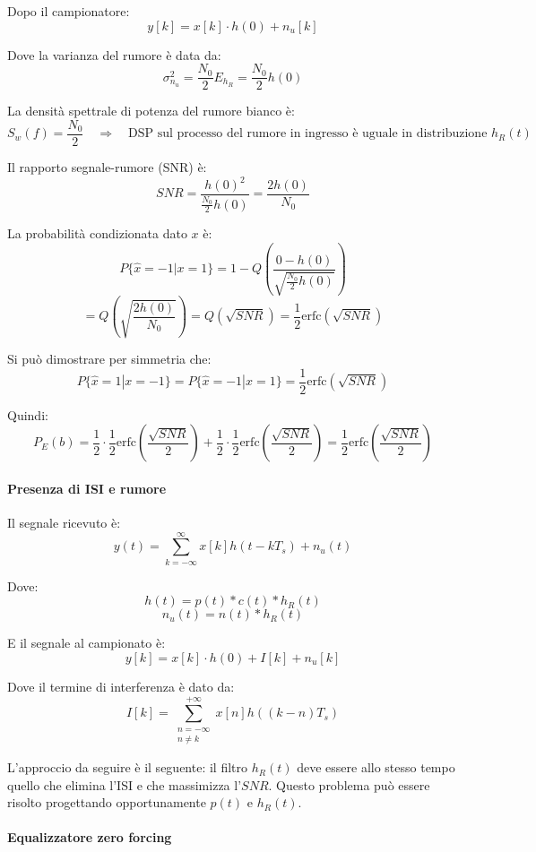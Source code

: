 Dopo il campionatore:
\[
    y[k] = x[k]\cdot h(0) + n_u[k]
\]

Dove la varianza del rumore è data da:
\[
    \sigma_{n_u}^2 = \frac{N_0}{2} E_{h_R} = \frac{N_0}{2} h(0)
\]

La densità spettrale di potenza del rumore bianco è:
\[
    S_w(f) = \frac{N_0}{2} \quad \Rightarrow \quad \text{DSP sul processo del rumore in ingresso è uguale in distribuzione } h_R(t)
\]

Il rapporto segnale-rumore (SNR) è:
\[
    SNR = \frac{h(0)^2}{\frac{N_0}{2} h(0)} = \frac{2 h(0)}{N_0}
\]

La probabilità condizionata dato $x$ è:
\[
    P\{ \hat{x} = -1 | x = 1 \} = 1 - Q\left( \frac{0 - h(0)}{\sqrt{\frac{N_0}{2} h(0)}} \right)
\]
\[
    = Q\left( \sqrt{\frac{2 h(0)}{N_0}} \right) = Q\left( \sqrt{SNR} \right) = \frac{1}{2} \text{erfc}\left( \sqrt{SNR} \right)
\]

Si può dimostrare per simmetria che:
\[
    P\{ \hat{x} = 1 | x = -1 \} = P\{ \hat{x} = -1 | x = 1 \} = \frac{1}{2} \text{erfc}\left( \sqrt{SNR} \right)
\]


Quindi:
\[
    P_E(b) = \frac{1}{2} \cdot \frac{1}{2} \text{erfc}\left( \frac{\sqrt{SNR}}{2} \right) + \frac{1}{2} \cdot \frac{1}{2} \text{erfc}\left( \frac{\sqrt{SNR}}{2} \right) = \frac{1}{2} \text{erfc}\left( \frac{\sqrt{SNR}}{2} \right)
\]

\paragraph{Presenza di ISI e rumore}

Il segnale ricevuto è:
\[
    y(t) = \sum_{k=-\infty}^{\infty} x[k] h(t - kT_s) + n_u(t)
\]

Dove:
\[
    h(t) = p(t) * c(t) * h_R(t)
\]
\[
    n_u(t) = n(t) * h_R(t)
\]

E il segnale al campionato è:
\[
    y[k] = x[k] \cdot h(0) + I[k] + n_u[k]
\]

Dove il termine di interferenza è dato da:
\[
    I[k] = \sum_{\substack{n=-\infty \\ n \neq k}}^{+\infty} x[n] h\left( (k-n)T_s \right)
\]

L'approccio da seguire è il seguente:
il filtro $h_R(t)$ deve essere allo stesso tempo quello che elimina l'ISI e che massimizza l'$SNR$. Questo problema può essere risolto progettando opportunamente $p(t)$ e $h_R(t)$.

\paragraph{Equalizzatore zero forcing}

